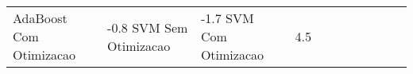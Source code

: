 \begin{table}[H]
\begin{adjustwidth}{ -1in }{ -1in }
\begin{tabular}{lllllllllll}
           AdaBoost Com Otimizacao &      -0.8%
                SVM Sem Otimizacao &      -1.7%
                SVM Com Otimizacao &       4.5%
\bottomrule
\end{tabular}
    \end{adjustwidth}
    \renewcommand{\arraystretch}{1.0} %
\end{table}
